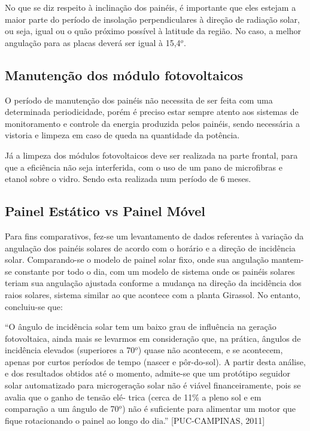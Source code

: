 	No que se diz respeito à inclinação dos painéis, é importante que eles estejam a maior parte do período de insolação perpendiculares à direção de radiação solar, ou seja, igual ou o quão próximo possível à latitude da região. No caso, a melhor angulação para as placas deverá ser igual à 15,4$^o$.

\subsection{Manutenção dos módulo fotovoltaicos}

	O período de manutenção dos painéis não necessita de ser feita com uma determinada periodicidade, porém é preciso estar sempre atento aos sistemas de monitoramento e controle da energia produzida pelos painéis, sendo necessária a vistoria e limpeza em caso de queda na quantidade da potência.

	Já a limpeza dos módulos fotovoltaicos deve ser realizada na parte frontal, para que a eficiência não seja interferida, com o uso de um pano de microfibras e etanol sobre o vidro. Sendo esta realizada num período de 6 meses.

\subsection{Painel Estático vs Painel Móvel}

	Para fins comparativos, fez-se um levantamento de dados referentes à variação da angulação dos painéis solares de acordo com o horário e a direção de incidência solar. Comparando-se o modelo de painel solar fixo, onde sua angulação mantem-se constante por todo o dia, com um modelo de sistema onde os painéis solares teriam sua angulação ajustada conforme a mudança na direção da incidência dos raios solares, sistema similar ao que acontece com a planta Girassol. No entanto, concluiu-se que:

	“O ângulo de incidência solar tem um baixo grau de influência na geração fotovoltaica, ainda mais se levarmos em consideração que, na prática, ângulos de incidência elevados (superiores a 70$^o$) quase não acontecem, e se acontecem, apenas por curtos períodos de tempo (nascer e pôr-do-sol). A partir desta análise, e dos resultados obtidos até o momento, admite-se que um protótipo seguidor solar automatizado para microgeração solar não é viável financeiramente, pois se avalia que o ganho de tensão elé- trica (cerca de 11\% a pleno sol e em comparação a um ângulo de 70$^o$) não é suficiente para alimentar um motor que fique rotacionando o painel ao longo do dia.” [PUC-CAMPINAS, 2011]

